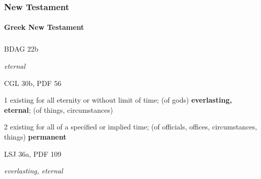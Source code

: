		
	\subsubsection{New Testament} %
		\label{ETERNITY-NT}
	
	
			
			
		\paragraph{Greek New Testament} %
			\label{ETERNITY-GREEK}
		
			\subparagraph{\texorpdfstring{}{}}
				\label{AIDIOS}
			
				\begin{compactdesc}
					\item[BDAG 22b] \textbf{}
						\begin{compactitem}
							\item \textit{eternal}
						\end{compactitem}
					\item[CGL 30b, PDF 56] \textbf{}
						\begin{compactitem}
							\item[1] existing for all eternity or without limit of time; (of gods) \textbf{everlasting, eternal}; (of things, circumstances)
							\item[2] existing for all of a specified or implied time; (of officials, offices, circumstances, things) \textbf{permanent}
						\end{compactitem}
					\item[LSJ 36a, PDF 109] \textbf{}
						\begin{compactitem}
							\item \textit{everlasting, eternal}
						\end{compactitem}
				\end{compactdesc}
				
